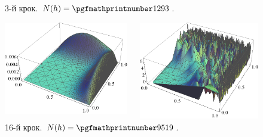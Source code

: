 \begin{frame}[allowframebreaks]
\begin{figure}[H]
\begin{columns}
\begin{column}{0.5\textwidth}
			     \end{column}
		     \end{columns}
		     \caption*{3-й крок. $N(h) = \nn{1293}$.}
		\end{figure}
		\begin{figure}[H]
			\begin{columns}
			 	\begin{column}{0.5\textwidth}
			 		\includegraphics[width=\textwidth]{problem2/my/solutions/solution16}
			 	 \end{column}
			     \begin{column}{0.5\textwidth}
			     	\includegraphics[width=\textwidth]{problem2/my/AEE/aee16}
			     \end{column}
		     \end{columns}
		     \caption*{16-й крок. $N(h) = \nn{9519}$.}
		\end{figure}
\end{frame}

